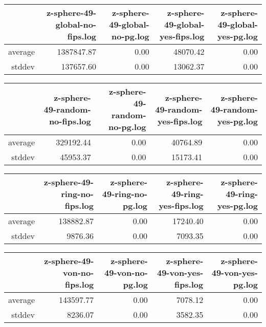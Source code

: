 \begin{table}[ht]
\centering
\begin{tabular}{rrrrr}
  \hline
 & z-sphere-49-global-no-fips.log & z-sphere-49-global-no-pg.log & z-sphere-49-global-yes-fips.log & z-sphere-49-global-yes-pg.log \\ 
  \hline
average & 1387847.87 & 0.00 & 48070.42 & 0.00 \\ 
  stddev & 137657.60 & 0.00 & 13062.37 & 0.00 \\ 
   \hline
\end{tabular}
\end{table}
\begin{table}[ht]
\centering
\begin{tabular}{rrrrr}
  \hline
 & z-sphere-49-random-no-fips.log & z-sphere-49-random-no-pg.log & z-sphere-49-random-yes-fips.log & z-sphere-49-random-yes-pg.log \\ 
  \hline
average & 329192.44 & 0.00 & 40764.89 & 0.00 \\ 
  stddev & 45953.37 & 0.00 & 15173.41 & 0.00 \\ 
   \hline
\end{tabular}
\end{table}
\begin{table}[ht]
\centering
\begin{tabular}{rrrrr}
  \hline
 & z-sphere-49-ring-no-fips.log & z-sphere-49-ring-no-pg.log & z-sphere-49-ring-yes-fips.log & z-sphere-49-ring-yes-pg.log \\ 
  \hline
average & 138882.87 & 0.00 & 17240.40 & 0.00 \\ 
  stddev & 9876.36 & 0.00 & 7093.35 & 0.00 \\ 
   \hline
\end{tabular}
\end{table}
\begin{table}[ht]
\centering
\begin{tabular}{rrrrr}
  \hline
 & z-sphere-49-von-no-fips.log & z-sphere-49-von-no-pg.log & z-sphere-49-von-yes-fips.log & z-sphere-49-von-yes-pg.log \\ 
  \hline
average & 143597.77 & 0.00 & 7078.12 & 0.00 \\ 
  stddev & 8236.07 & 0.00 & 3582.35 & 0.00 \\ 
   \hline
\end{tabular}
\end{table}
